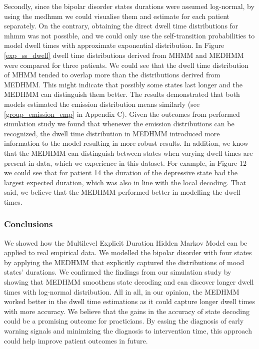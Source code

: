 Secondly, since the bipolar disorder states durations were assumed log-normal, by using the \ac{medhmm} we could visualise them and estimate for each patient separately. On the contrary, obtaining the direct dwell time distributions for \ac{mhmm} was not possible, and we could only use the self-transition probabilities to model dwell times with approximate exponential distribution. In Figure \ref{exp_ss_dwell} dwell time distributions derived from MHMM and MEDHMM were compared for three patients. We could see that the dwell time distribution of MHMM tended to overlap more than the distributions derived from MEDHMM. This might indicate that possibly some states last longer and the MEDHMM can distinguish them better. The results demonstrated that both models estimated the emission distribution means similarly (see \ref{group_emission_emp} in Appendix C). Given the outcomes from performed simulation study we found that whenever the emission distributions can be recognized, the dwell time distribution in MEDHMM introduced more information to the model resulting in more robust results. In addition, we know that the MEDHMM can distinguish between states when varying dwell times are present in data, which we experience in this dataset. For example, in Figure 12 we could see that for patient 14 the duration of the depressive state had the largest expected duration, which was also in line with the local decoding. That said, 
we believe that the MEDHMM performed better in modelling the dwell times. 

\subsubsection*{Conclusions}
We showed how the Multilevel Explicit Duration Hidden Markov Model can be applied to real empirical data. We modelled the bipolar disorder with four states by applying the MEDHMM that explicitly captured the distributions of mood states' durations. We confirmed the findings from our simulation study by showing that MEDHMM smoothens state decoding and can discover longer dwell times with log-normal distribution. All in all, in our opinion, the MEDHMM worked better in the dwell time estimations as it could capture longer dwell times with more accuracy. We believe that the gains in the accuracy of state decoding could be a promising outcome for practicians. By easing the diagnosis of early warning signals and minimizing the diagnosis to intervention time, this approach could help improve patient outcomes in future. 

